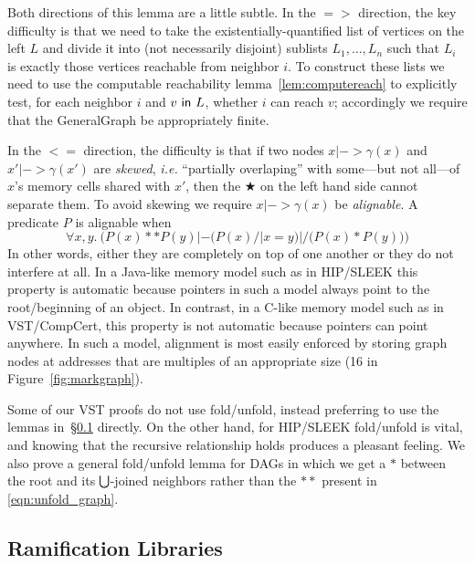 Both directions of this lemma are a little subtle.  In the $=>$ direction, the key difficulty is that we need to take the existentially-quantified list of vertices on the left $L$ and divide it into (not necessarily disjoint) sublists $L_1, \dots, L_n$ such that $L_i$ is exactly those vertices reachable from neighbor $i$.  To construct these lists we need to use the computable reachability lemma~\ref{lem:computereach} to explicitly test, for each neighbor $i$ and $v\ \mathsf{in}\ L$, whether $i$ can reach $v$; accordingly we require that the GeneralGraph be appropriately finite.

In the $<=$ direction, the difficulty is that if two nodes $x |-> \gamma(x)$ and $x' |-> \gamma(x')$ are \emph{skewed}, \emph{i.e.} ``partially overlaping'' with some---but not all---of $x$'s memory cells shared with $x'$, then the $\bigstar$ on the left hand side cannot separate them.  To avoid skewing we require $x |-> \gamma(x)$ be \emph{alignable}.  A predicate $P$ is alignable when
\[
\forall x,y.~ \Big(P(x) ** P(y) |- \big(P(x) /| x = y\big) |/ \big(P(x) * P(y)\big)\Big)
\]
In other words, either they are completely on top of one another or they do not interfere at all.  In a Java-like memory model such as in HIP/SLEEK this property is automatic because pointers in such a model always point to the root/beginning of an object.  In contrast, in a C-like memory model such as in VST/CompCert, this property is not automatic because pointers can point anywhere.  In such a model, alignment is most easily enforced by storing graph nodes at addresses that are multiples of an appropriate size (16 in Figure~\ref{fig:markgraph}).

Some of our VST proofs do not use fold/unfold, instead preferring to use the lemmas in~\S\ref{sec:ramifylib} directly.  On the other hand, for HIP/SLEEK fold/unfold is vital, and knowing that the recursive relationship holds produces a pleasant feeling.  We also prove a general fold/unfold lemma for DAGs in which we get a $*$ between the root and its $\medocon$-joined neighbors rather than the $**$ present in \eqref{eqn:unfold_graph}.

\subsection{Ramification Libraries}\label{sec:ramifylib}

